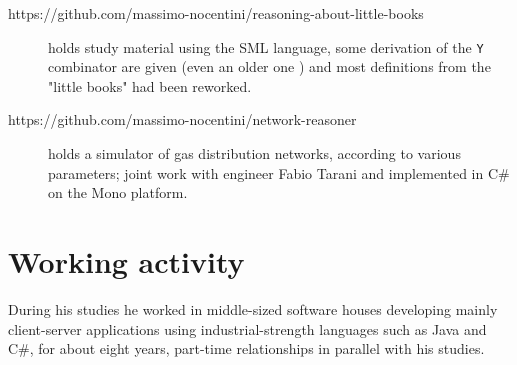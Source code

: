 \documentclass[a4paper]{tufte-handout}
\begin{document}
\begin{description}
        \item[https://github.com/massimo-nocentini/reasoning-about-little-books]
        holds study material using the SML language, some derivation of the \verb|Y|
        combinator are given (even an older one ) and most definitions from
        the "little books" had been reworked.

        \item[https://github.com/massimo-nocentini/network-reasoner] holds a
        simulator of gas distribution networks, according to various
        parameters; joint work with engineer Fabio Tarani and implemented in
        C\# on the Mono platform.
        

        
    \end{description}

    \section{Working activity}

    During his studies he worked in middle-sized software houses
     developing mainly client-server
    applications using industrial-strength languages such as Java and C\#, for
    about eight years, part-time relationships in parallel with his studies.
        
    
\end{document}

